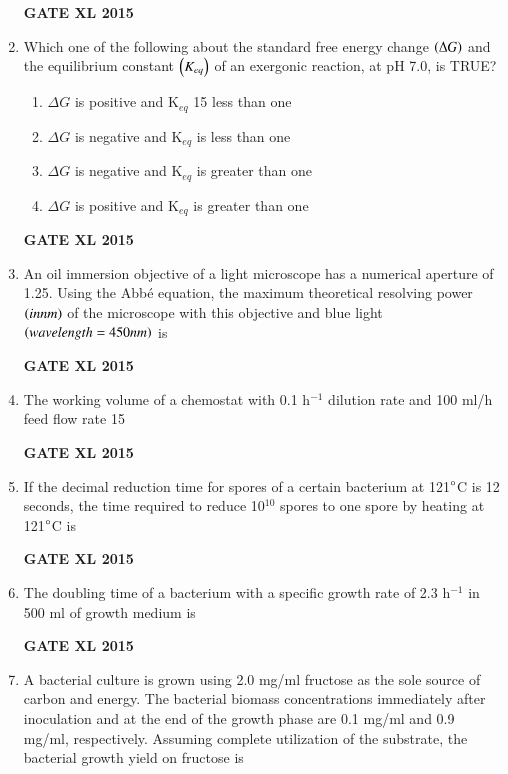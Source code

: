 \documentclass[journal,12pt,onecolumn]{IEEEtran}
\begin{document}
\begin{enumerate}
\begin{flushright}\textbf{GATE XL 2015}\end{flushright}
\item Which one of the following about the standard free energy change $\left(\Delta G\right)$ and the equilibrium constant $\left(K_{eq}\right)$ of an exergonic reaction, at pH 7.0, is TRUE?
    \begin{enumerate}
            \item $\Delta G$ is positive and K$_{eq}$ 15 less than one
	    \item $\Delta G$ is negative and K$_{eq}$ is less than one
	    \item $\Delta G$ is negative and K$_{eq}$ is greater than one
            \item $\Delta G$ is positive and K$_{eq}$ is greater than one
    \end{enumerate}
\begin{flushright}\textbf{GATE XL 2015}\end{flushright}
\item An oil immersion objective of a light microscope has a numerical aperture of 1.25. Using the Abbé equation, the maximum theoretical resolving power $\left(in nm\right)$ of the microscope with this objective and blue light $\left(wavelength=450 nm\right)$ is

\begin{flushright}\textbf{GATE XL 2015}\end{flushright}
\item The working volume  of a chemostat with 0.1 h$^{-1}$ dilution rate and 100 ml/h feed flow rate 15
\begin{flushright}\textbf{GATE XL 2015}\end{flushright}
\item If the decimal reduction time for spores of a certain bacterium at 121$\degree$C is 12 seconds, the time required  to reduce 10$^{10}$ spores to one spore by heating at 121$\degree$C is
\begin{flushright}\textbf{GATE XL 2015}\end{flushright}
\item	The doubling time  of a bacterium with a specific growth rate of 2.3 h$^{-1}$ in 500 ml of growth medium is
\begin{flushright}\textbf{GATE XL 2015}\end{flushright}
\item
A bacterial culture is grown using 2.0 mg/ml fructose as the sole source of carbon and energy. The bacterial biomass concentrations immediately after inoculation and at the end of the growth phase are 0.1 mg/ml and 0.9 mg/ml, respectively. Assuming complete utilization of the substrate, the bacterial growth yield  on fructose is 
        

\end{enumerate}
\end{document}
